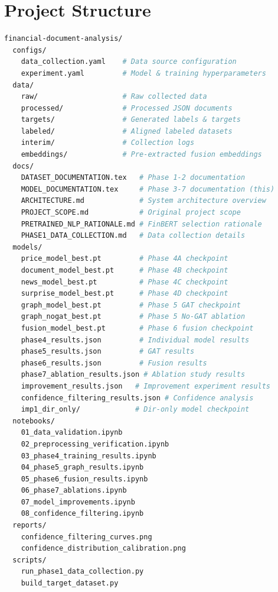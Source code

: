 \documentclass[12pt,a4paper]{article}
\begin{document}
\section{Project Structure}
\label{sec:structure}

\begin{lstlisting}[language=bash,caption={Final project directory layout}]
financial-document-analysis/
  configs/
    data_collection.yaml    # Data source configuration
    experiment.yaml         # Model & training hyperparameters
  data/
    raw/                    # Raw collected data
    processed/              # Processed JSON documents
    targets/                # Generated labels & targets
    labeled/                # Aligned labeled datasets
    interim/                # Collection logs
    embeddings/             # Pre-extracted fusion embeddings
  docs/
    DATASET_DOCUMENTATION.tex   # Phase 1-2 documentation
    MODEL_DOCUMENTATION.tex     # Phase 3-7 documentation (this)
    ARCHITECTURE.md             # System architecture overview
    PROJECT_SCOPE.md            # Original project scope
    PRETRAINED_NLP_RATIONALE.md # FinBERT selection rationale
    PHASE1_DATA_COLLECTION.md   # Data collection details
  models/
    price_model_best.pt         # Phase 4A checkpoint
    document_model_best.pt      # Phase 4B checkpoint
    news_model_best.pt          # Phase 4C checkpoint
    surprise_model_best.pt      # Phase 4D checkpoint
    graph_model_best.pt         # Phase 5 GAT checkpoint
    graph_nogat_best.pt         # Phase 5 No-GAT ablation
    fusion_model_best.pt        # Phase 6 fusion checkpoint
    phase4_results.json         # Individual model results
    phase5_results.json         # GAT results
    phase6_results.json         # Fusion results
    phase7_ablation_results.json # Ablation study results
    improvement_results.json   # Improvement experiment results
    confidence_filtering_results.json # Confidence analysis
    imp1_dir_only/             # Dir-only model checkpoint
  notebooks/
    01_data_validation.ipynb
    02_preprocessing_verification.ipynb
    03_phase4_training_results.ipynb
    04_phase5_graph_results.ipynb
    05_phase6_fusion_results.ipynb
    06_phase7_ablations.ipynb
    07_model_improvements.ipynb
    08_confidence_filtering.ipynb
  reports/
    confidence_filtering_curves.png
    confidence_distribution_calibration.png
  scripts/
    run_phase1_data_collection.py
    build_target_dataset.py

\end{lstlisting}
\end{document}
